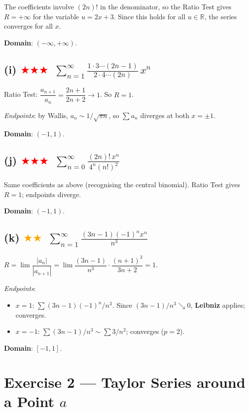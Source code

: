 \documentclass[12pt,a4paper]{article}
\newcommand{\medium}{\textcolor{orange}{$\bigstar\bigstar$}}
\newcommand{\hard}{\textcolor{red}{$\bigstar\bigstar\bigstar$}}
\begin{document}
The coefficients involve $(2n)!$ in the denominator, so the Ratio Test gives $R=+\infty$ for the variable $u=2x+3$.  Since this holds for all $u\in\mathbb{R}$, the series converges for all $x$.

\textbf{Domain}: $(-\infty,+\infty)$.

\subsection*{(i) \hard\ $\displaystyle\sum_{n=1}^{\infty}\frac{1\cdot3\cdots(2n-1)}{2\cdot4\cdots(2n)}\,x^n$}

Ratio Test: $\dfrac{a_{n+1}}{a_n}=\dfrac{2n+1}{2n+2}\to 1$.  So $R=1$.

\textit{Endpoints}: by Wallis, $a_n\sim 1/\sqrt{\pi n}$, so $\sum a_n$ diverges at both $x=\pm 1$.

\textbf{Domain}: $(-1, 1)$.

\subsection*{(j) \hard\ $\displaystyle\sum_{n=0}^{\infty}\frac{(2n)!\,x^n}{4^n(n!)^2}$}

Same coefficients as above (recognising the central binomial).  Ratio Test gives $R=1$; endpoints diverge.

\textbf{Domain}: $(-1, 1)$.

\subsection*{(k) \medium\ $\displaystyle\sum_{n=1}^{\infty}\frac{(3n-1)(-1)^n x^n}{n^3}$}

$R = \lim\dfrac{|a_n|}{|a_{n+1}|}=\lim\dfrac{(3n-1)}{n^3}\cdot\dfrac{(n+1)^3}{3n+2}=1$.

\textit{Endpoints}:
\begin{itemize}
  \item $x=1$: $\sum(3n-1)(-1)^n/n^3$.  Since $(3n-1)/n^3\searrow 0$, \textbf{Leibniz} applies; converges.
  \item $x=-1$: $\sum(3n-1)/n^3\sim\sum 3/n^2$; converges ($p=2$).
\end{itemize}
\textbf{Domain}: $[-1, 1]$.

\section*{Exercise 2 — Taylor Series around a Point $a$}
\end{document}
